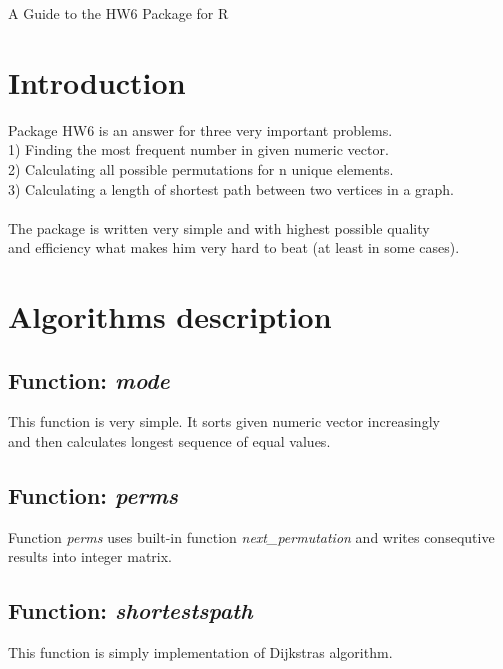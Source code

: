 \documentclass[pdftex,12pt]{article}\usepackage[]{graphicx}\usepackage[]{color}
\begin{document}
\begin{center}
{\Huge A Guide to the \textsf{HW6} Package for \textsf{R}}

\end{center}
\section{Introduction}
Package \textsf{HW6} is an answer for three very important problems.\\
1) Finding the most frequent number in given numeric vector.\\
2) Calculating all possible permutations for n unique elements.\\
3) Calculating a length of shortest path between two vertices in a graph.\\\\


\noindent The package is written very simple and with highest possible quality\\
and efficiency what makes him very hard to beat (at least in some cases).
\section{Algorithms description}
\subsection{Function: \emph{mode}}
This function is very simple. It sorts given numeric vector increasingly\\
and then calculates longest sequence of equal values.

\subsection{Function: \emph{perms}}
Function \emph{perms} uses built-in function \emph{next\_permutation} and writes consequtive results into integer matrix.
\subsection{Function: \emph{shortestspath}}
This function is simply implementation of Dijkstras algorithm.
\end{document}
